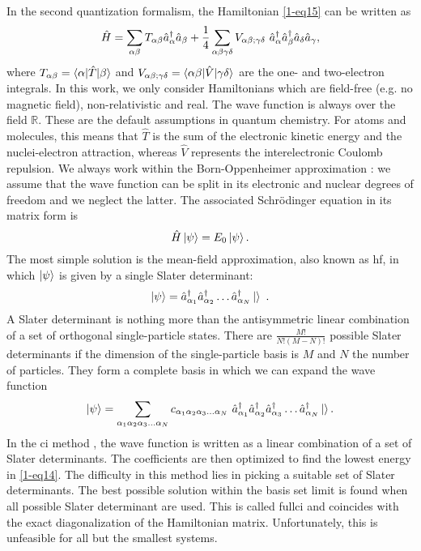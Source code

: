 In the second quantization formalism, the Hamiltonian \eqref{1-eq15} can be written as
\begin{equation}
    \hat H = \sum_{\alpha\beta} T_{\alpha\beta} \hat{a}_{\alpha}^{\dagger}\hat{a}_{\beta} + \frac14 \sum_{\alpha\beta\gamma\delta} V_{\alpha\beta;\gamma\delta}~ \hat{a}_{\alpha}^{\dagger}\hat{a}_{\beta}^{\dagger}\hat{a}_{\delta}\hat{a}_{\gamma},
    \label{1-eq13}
\end{equation}
where $T_{\alpha\beta}=\braket{\alpha|\hat T|\beta}$ and $V_{\alpha\beta;\gamma\delta}=\braket{\alpha\beta|\hat V|\gamma\delta}$ are the one- and two-electron integrals. 
In this work, we only consider Hamiltonians which are field-free (e.g. no magnetic field), non-relativistic and real. The wave function is always over the field $\mathbb{R}$. These are the default assumptions in quantum chemistry.
For atoms and molecules, this means that $\hat T$ is the sum of the electronic kinetic energy and the nuclei-electron attraction, whereas $\hat V$ represents the interelectronic Coulomb repulsion. We always work within the Born-Oppenheimer approximation \citep{szabo_modern_1996}: we assume that the wave function can be split in its electronic and nuclear degrees of freedom and we neglect the latter.
The associated Schrödinger equation in its matrix form is
\begin{equation}
    \hat H \ket{\psi} = E_0 \ket{\psi}.
    \label{1-eq14}
\end{equation}
The most simple solution is the mean-field approximation, also known as \gls{hf}, in which $\ket{\psi}$ is given by a single Slater determinant:
\begin{equation}
    \ket{\psi} = \hat{a}_{\alpha_1}^{\dagger}\hat{a}_{\alpha_2}^{\dagger}\ldots\hat{a}_{\alpha_N}^{\dagger}\ket{}~.
    \label{1-eq17}
\end{equation}
A Slater determinant is nothing more than the antisymmetric linear combination of a set of orthogonal single-particle states.
There are $\frac{M!}{N!(M-N)!}$ possible Slater determinants if the dimension of the single-particle basis is $M$ and $N$ the number of particles. They form a complete basis in which we can expand the wave function
\begin{equation}
    \ket{\psi} = \sum_{\alpha_1 \alpha_2 \alpha_3 \ldots \alpha_N} c_{\alpha_1 \alpha_2 \alpha_3 \ldots \alpha_N} ~ \hat{a}_{\alpha_1}^{\dagger}\hat{a}_{\alpha_2}^{\dagger}\hat{a}_{\alpha_3}^{\dagger}\ldots \hat{a}_{\alpha_N}^{\dagger} \ket{}.
    \label{1-eq18}
\end{equation}
In the \gls{ci} method \citep{helgaker2007molecular}, the wave function is written as a linear combination of a set of Slater determinants. The coefficients are then optimized to find the lowest energy in \cref{1-eq14}. The difficulty in this method lies in picking a suitable set of Slater determinants. 
The best possible solution within the basis set limit is found when all possible Slater determinant are used. This is called \gls{fullci} and coincides with the exact diagonalization of the Hamiltonian matrix. Unfortunately, this is unfeasible for all but the smallest systems. 



